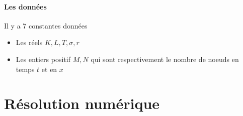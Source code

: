 \documentclass{book}
\begin{document}
\vspace{1.5cm}
\paragraph{Les données}
Il y a 7 constantes données
\begin{itemize}
 \item Les réels $K,L,T,\sigma,r$
 \item Les entiers positif $M,N$ qui sont respectivement le nombre de noeuds en temps $t$ et en $x$
\end{itemize}

\section{Résolution numérique}
\end{document}
